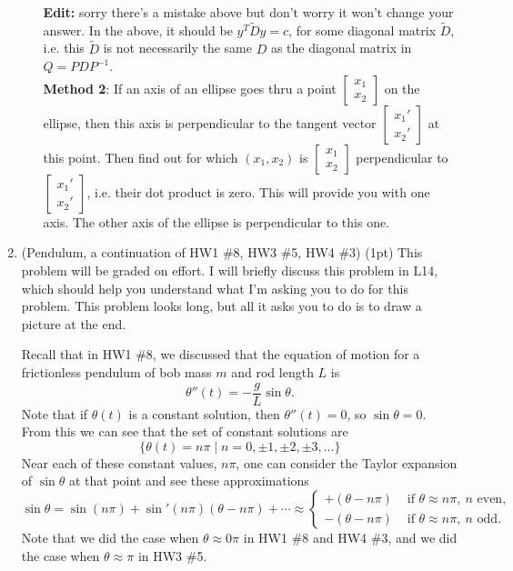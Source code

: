 \documentclass[11pt]{article}
\theoremstyle{definition}
\begin{document}
\begin{enumerate}[leftmargin=*]
\begin{itemize}
\textbf{Edit:}  sorry there's a mistake above but don't worry it won't  change your answer.  In the above, it should be $y^T\widetilde{D}y=c$, for some diagonal matrix $\widetilde{D}$, i.e. this $\widetilde D$ is not necessarily the same $D$ as the diagonal matrix in $Q=PDP^{-1}$.\\


\textbf{Method 2}: If an axis of an ellipse goes thru a point $\left[
\begin{array}{c}
x_1\\
x_2
\end{array}\right]$ on the ellipse, then this axis is perpendicular to the tangent vector $\left[
\begin{array}{c}
x_1'\\
x_2'
\end{array}\right]$ at this point.  Then find out for which $(x_1, x_2)$ is    $\left[
\begin{array}{c}
x_1\\
x_2
\end{array}\right]$ perpendicular to $\left[
\begin{array}{c}
x_1'\\
x_2'
\end{array}\right]$, i.e. their dot product is zero.  This will provide you with one axis.  The other axis of the ellipse is perpendicular to this one.  \\\end{itemize}


\item
(Pendulum, a continuation of HW1 \#8, HW3 \#5, HW4 \#3)  (1pt) This problem will be graded on effort.  I will briefly discuss this problem in L14, which should help you understand what I'm asking you to do for this problem.  This problem looks long, but all it asks you to do is to draw a picture at the end.

Recall that in HW1 \#8, we discussed that the equation of motion for a frictionless pendulum of bob mass $m$ and rod length $L$ is
\[
\theta''(t)=-\frac{g}{L}\sin \theta.
\]
Note that if  $\theta(t)$ is a constant solution, then $\theta''(t)=0$, so $\sin \theta=0$.  From this we can see that the set of constant solutions are 
\[
\{\theta(t)=n\pi\mid n= 0, \pm 1, \pm 2, \pm 3, \ldots\}
\]
Near each of these constant values, $n\pi$, one can consider the Taylor expansion of $\sin \theta$ at that point and see these approximations
\[
\sin\theta = \sin(n\pi)+\sin'(n\pi)(\theta-n\pi)+\cdots \approx \begin{cases} 
+(\theta-n\pi)& \text{ if } \theta\approx n\pi,\  n \text { even},\\
- (\theta- n\pi) & \text{ if } \theta \approx n\pi, \ n \text{ odd}.
\end{cases}
\]
Note that we did the case when $\theta\approx 0\pi$ in HW1 \#8 and HW4 \#3, and we did the case when $\theta\approx \pi$ in HW3 \#5.  


\end{enumerate}
\end{document}
